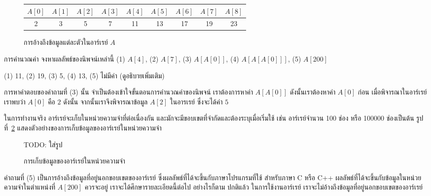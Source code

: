 \begin{figure}
\begin{center}
\begin{tabular}{|c|c|c|c|c|c|c|c|c|}
\hline
$A[0]$ & $A[1]$ & $A[2]$ & $A[3]$ & $A[4]$ & $A[5]$ & $A[6]$ & $A[7]$ & $A[8]$ \\
\hline
2 & 3 & 5 & 7 & 11 & 13 & 17 & 19 & 23\\
\hline
\end{tabular}
\end{center}
\caption{การ{\wbr}อ้าง{\wbr}ถึง{\wbr}ข้อมูล{\wbr}แต่ละ{\wbr}ตัว{\wbr}ใน{\wbr}อาร์เรย์ $A$}
\label{fig:array-array-access}
\end{figure}


\begin{quiz}{การ{\wbr}คำนวณ{\wbr}ค่า}
จง{\wbr}หา{\wbr}ผลลัพธ์{\wbr}ของ{\wbr}นิพจน์{\wbr}เหล่านี้ (1) $A[4]$, (2) $A[7]$, (3) $A[A[0]]$, 
(4) $A[A[A[0]]]$, (5) $A[200]$
\end{quiz}
\begin{quizans}
(1) 11, (2) 19, (3) 5, (4) 13, (5) ไม่{\wbr}มี{\wbr}ค่า (ดู{\wbr}อธิบาย{\wbr}เพิ่มเติม)
\end{quizans}

การ{\wbr}หา{\wbr}คำตอบ{\wbr}ของ{\wbr}คำถาม{\wbr}ที่ (3) นั้น จำเป็น{\wbr}ต้อง{\wbr}เข้าใจ{\wbr}ขั้นตอน{\wbr}การ{\wbr}คำนวณ{\wbr}ค่า{\wbr}ของ{\wbr}นิพจน์{\wbr}
เรา{\wbr}ต้องการ{\wbr}หา{\wbr}ค่า $A[A[0]]$ ดังนั้น{\wbr}เรา{\wbr}ต้องหา{\wbr}ค่า $A[0]$ ก่อน{\wbr}
เมื่อ{\wbr}พิจารณา{\wbr}ใน{\wbr}อาร์เรย์{\wbr}เรา{\wbr}พบ{\wbr}ว่า $A[0]$ คือ $2$ ดังนั้น จากนั้น{\wbr}เรา{\wbr}จึง{\wbr}พิจารณา{\wbr}ข้อมูล{\wbr}
$A[2]$ ใน{\wbr}อา{\wbr}รเรย์ ซึ่ง{\wbr}จะ{\wbr}ได้{\wbr}ค่า $5$

ใน{\wbr}การ{\wbr}ทำงาน{\wbr}จริง อาร์เรย์จะ{\wbr}เก็บ{\wbr}ใน{\wbr}หน่วยความจำ{\wbr}ที่{\wbr}ต่อเนื่อง{\wbr}กัน{\wbr}
และ{\wbr}มักจะ{\wbr}มี{\wbr}ขอบเขต{\wbr}ที่{\wbr}จำกัด{\wbr}และ{\wbr}ต้อง{\wbr}ระบุ{\wbr}เมื่อ{\wbr}เริ่ม{\wbr}ใช้ เช่น อาร์เรย์จำนวน 100 ช่อง หรือ{\wbr}
100000 ช่อง{\wbr}เป็นต้น รูป{\wbr}ที่~\ref{fig:array-array-in-mem}
แสดง{\wbr}ตัวอย่าง{\wbr}ของ{\wbr}การ{\wbr}เก็บ{\wbr}ข้อมูล{\wbr}ของ{\wbr}อาร์เรย์{\wbr}ใน{\wbr}หน่วยความจำ{\wbr}

\begin{figure}
TODO: ใส่{\wbr}รูป{\wbr}
\caption{การ{\wbr}เก็บ{\wbr}ข้อมูล{\wbr}ของ{\wbr}อาร์เรย์{\wbr}ใน{\wbr}หน่วยความจำ}
\label{fig:array-array-in-mem}
\end{figure}

คำถาม{\wbr}ที่ (5) เป็น{\wbr}การ{\wbr}อ้าง{\wbr}ถึง{\wbr}ข้อมูล{\wbr}ที่อยู่{\wbr}นอก{\wbr}ขอบเขต{\wbr}ของ{\wbr}อาร์เรย์
ซึ่ง{\wbr}ผลลัพธ์{\wbr}ที่{\wbr}ได้{\wbr}จะ{\wbr}ขึ้น{\wbr}กับ{\wbr}ภาษา{\wbr}โปรแกรม{\wbr}ที่{\wbr}ใช้ สำหรับ{\wbr}ภาษา C หรือ C++
ผลลัพธ์{\wbr}ที่{\wbr}ได้{\wbr}จะ{\wbr}ขึ้น{\wbr}กับ{\wbr}ข้อมูล{\wbr}ใน{\wbr}หน่วยความจำ{\wbr}ใน{\wbr}ตำแหน่ง{\wbr}ที่ $A[200]$ ควร{\wbr}จะ{\wbr}อยู่{\wbr}
เรา{\wbr}จะ{\wbr}ได้{\wbr}ศึกษา{\wbr}รายละเอียด{\wbr}นี้{\wbr}ต่อไป อย่างไรก็ตาม ปกติ{\wbr}แล้ว ใน{\wbr}การ{\wbr}ใช้{\wbr}งาน{\wbr}อาร์เรย์
เรา{\wbr}จะ{\wbr}ไม่{\wbr}อ้าง{\wbr}ถึง{\wbr}ข้อมูล{\wbr}ที่อยู่{\wbr}นอก{\wbr}ขอบเขต{\wbr}ของ{\wbr}อาร์เรย์

